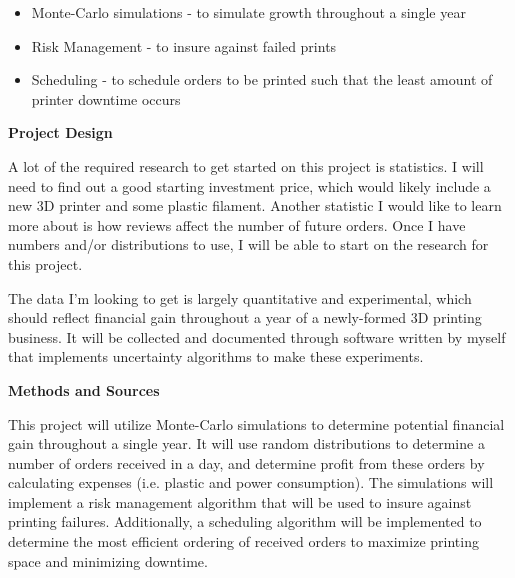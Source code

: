 \documentclass[11pt]{article}
\begin{document}
\begin{itemize}
    \item Monte-Carlo simulations - to simulate growth throughout a single year
    \item Risk Management - to insure against failed prints
    \item Scheduling - to schedule orders to be printed such that the least amount of printer downtime occurs
\end{itemize}

\bigbreak

\textbf{Project Design}

A lot of the required research to get started on this project is statistics. I will need to find out a good starting investment price, which would likely include a
new 3D printer and some plastic filament. Another statistic I would like to learn more about is how reviews affect the number of future orders. Once I have numbers
and/or distributions to use, I will be able to start on the research for this project.

The data I'm looking to get is largely quantitative and experimental, which should reflect financial gain throughout a year of a newly-formed 3D printing business.
It will be collected and documented through software written by myself that implements uncertainty algorithms to make these experiments.


\bigbreak

\textbf{Methods and Sources}

This project will utilize Monte-Carlo simulations to determine potential financial gain throughout a single year. It will use random distributions
to determine a number of orders received in a day, and determine profit from these orders by calculating expenses (i.e. plastic and power consumption).
The simulations will implement a risk management algorithm that will be used to insure against printing failures. Additionally, a scheduling algorithm will
be implemented to determine the most efficient ordering of received orders to maximize printing space and minimizing downtime.
\end{document}
